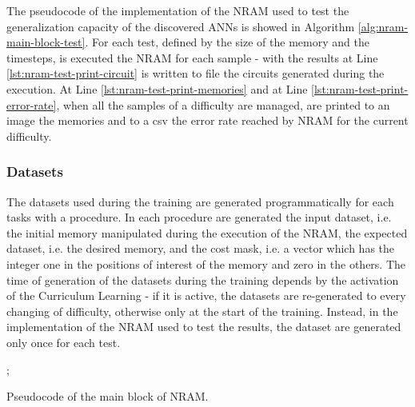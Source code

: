 The pseudocode of the implementation of the NRAM used to test the generalization capacity of the discovered ANNs is showed in Algorithm \ref{alg:nram-main-block-test}. For each test, defined by the size of the memory and the timesteps, is executed the NRAM for each sample - with the results at Line \ref{lst:nram-test-print-circuit} is written to file the circuits generated during the execution. At Line \ref{lst:nram-test-print-memories} and at Line \ref{lst:nram-test-print-error-rate}, when all the samples of a difficulty are managed, are printed to an image the memories and to a csv the error rate reached by NRAM for the current difficulty. 


\subsubsection{Datasets}
The datasets used during the training are generated programmatically for each tasks with a procedure. In each procedure are generated the input dataset, i.e. the initial memory manipulated during the execution of the NRAM, the expected dataset, i.e. the desired memory, and the cost mask, i.e. a vector which has the integer one in the positions of interest of the memory and zero in the others. The time of generation of the datasets during the training depends by the activation of the Curriculum Learning - if it is active, the datasets are re-generated to every changing of difficulty, otherwise only at the start of the training. Instead, in the implementation of the NRAM used to test the results, the dataset are generated only once for each test.

\begin{algorithm}
	\begin{algorithmic}[1]
            	;
			\label{lst:nram-timesteps}
				\label{lst:nram-nn-predict}
				\label{lst:nram-run-circuit}
				\State{}
				\label{lst:nram-cost-1}
				\Else
				\EndIf
				\State{}
				\State{}
				\State{}
                	\label{lst:nram-cost-2}
			\EndFor{}
			\State{}
		\EndFunction
	\end{algorithmic}
	\caption{Pseudocode of the main block of NRAM.}\label{alg:nram-main-block}
\end{algorithm}

